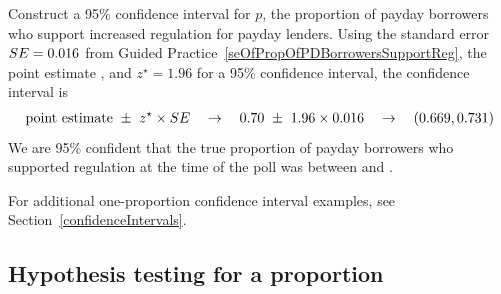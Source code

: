 \begin{examplewrap}
\begin{nexample}{Construct a 95\% confidence interval for $p$,
    the proportion of payday borrowers who support increased
    regulation for payday lenders.}
  Using the standard error $SE = 0.016{}$ from
  Guided Practice~\ref{seOfPropOfPDBorrowersSupportReg},
  the point estimate \paydayRegProp{},
  and $z^{\star} = 1.96$ for a 95\% confidence interval,
  the confidence interval is
  \begin{eqnarray*}
  \text{point estimate} \ \pm\ z^{\star} \times SE
      \quad\to\quad
      0.70{} \ \pm\ 1.96 \times 0.016{}
      \quad\to\quad
      (0.669{}, 0.731{})
  \end{eqnarray*}
  We are 95\% confident that the true proportion of
  payday borrowers who supported regulation at the time
  of the poll was between \paydayRegLower{} and
  \paydayRegUpper{}.
\end{nexample}
\end{examplewrap}

\onepropconfintsummary{}

\noindent%
For additional one-proportion confidence interval examples,
see Section~\ref{confidenceIntervals}.


\subsection{Hypothesis testing for a proportion}
\label{htForPropSection}

\newcommand{\paydayCCPerc}{51\%}
\newcommand{\paydayCCProp}{0.51}
\newcommand{\paydayCCSE}{0.017}
\newcommand{\paydayCCSEPerc}{1.7\%}
\newcommand{\paydayCCZ}{0.59}
\newcommand{\paydayCCOneTail}{0.2776}
\newcommand{\paydayCCPvalue}{0.5552}

